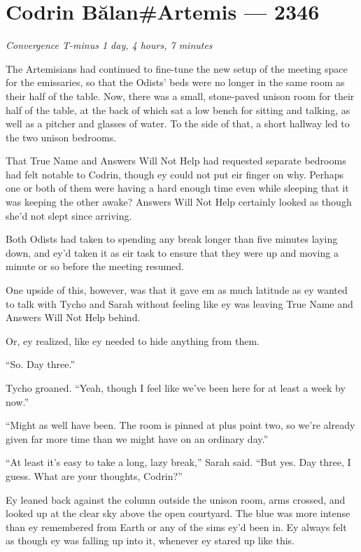 \hypertarget{codrin-bux103lanartemis-2346}{%
\chapter{Codrin Bălan\#Artemis — 2346}}

\begin{center}
\emph{Convergence T-minus 1 day, 4 hours, 7 minutes}
\end{center}

\noindent The Artemisians had continued to fine-tune the new setup of the meeting space for the emissaries, so that the Odists' beds were no longer in the same room as their half of the table. Now, there was a small, stone-paved unison room for their half of the table, at the back of which sat a low bench for sitting and talking, as well as a pitcher and glasses of water. To the side of that, a short hallway led to the two unison bedrooms.

That True Name and Answers Will Not Help had requested separate bedrooms had felt notable to Codrin, though ey could not put eir finger on why. Perhaps one or both of them were having a hard enough time even while sleeping that it was keeping the other awake? Answers Will Not Help certainly looked as though she'd not slept since arriving.

Both Odists had taken to spending any break longer than five minutes laying down, and ey'd taken it as eir task to ensure that they were up and moving a minute or so before the meeting resumed.

One upside of this, however, was that it gave em as much latitude as ey wanted to talk with Tycho and Sarah without feeling like ey was leaving True Name and Answers Will Not Help behind.

Or, ey realized, like ey needed to hide anything from them.

``So. Day three.''

Tycho groaned. ``Yeah, though I feel like we've been here for at least a week by now.''

``Might as well have been. The room is pinned at plus point two, so we're already given far more time than we might have on an ordinary day.''

``At least it's easy to take a long, lazy break,'' Sarah said. ``But yes. Day three, I guess. What are your thoughts, Codrin?''

Ey leaned back against the column outside the unison room, arms crossed, and looked up at the clear sky above the open courtyard. The blue was more intense than ey remembered from Earth or any of the sims ey'd been in. Ey always felt as though ey was falling up into it, whenever ey stared up like this.

